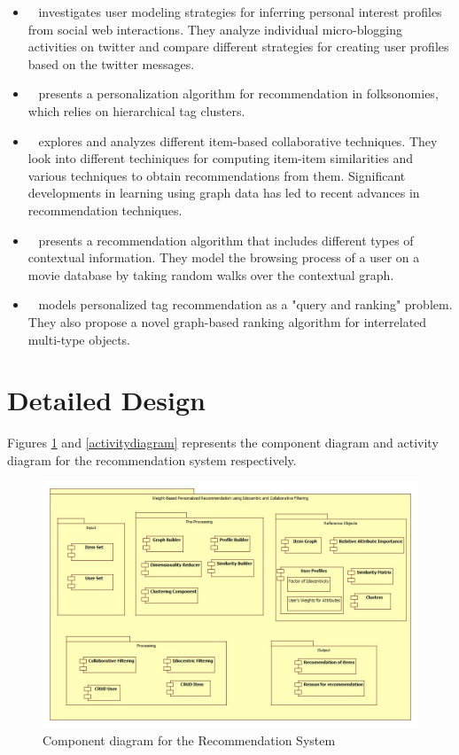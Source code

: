 \documentclass[11pt]{article}
\begin{document}
\begin{itemize}
 \item ~\cite{fabian} investigates user modeling strategies for inferring personal interest profiles from social web interactions. They analyze individual micro-blogging activities on twitter and compare different strategies for creating user profiles based on the twitter messages.
 \item ~\cite{andriy} presents a personalization algorithm for recommendation in folksonomies, which relies on hierarchical tag clusters.
 \item ~\cite{sarwar} explores and analyzes different item-based collaborative techniques. They look into different techiniques for computing item-item similarities and various techniques to obtain recommendations from them. Significant developments in learning using graph data has led to recent advances in recommendation techniques.
 \item ~\cite{toine} presents a recommendation algorithm that includes different types of contextual information. They model the browsing process of a user on a movie database by taking random walks over the contextual graph.
 \item ~\cite{ziyu} models personalized tag recommendation as a "query and ranking" problem. They also propose a novel graph-based ranking algorithm for interrelated multi-type objects.
\end{itemize}

\section{Detailed Design}

Figures \ref{componentDiagram} and \ref{activitydiagram} represents the component diagram and activity diagram for the recommendation system respectively.

\begin{figure}[htp]
\centering
\includegraphics[scale=0.35]{Images/componentDiagram.jpg}
\caption{Component diagram for the Recommendation System}
\label{componentDiagram}
\end{figure}
\end{document}
